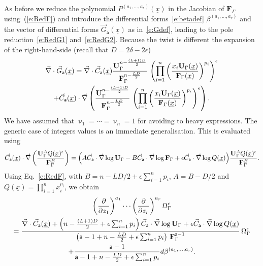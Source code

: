 \documentclass[a4paper,12pt]{article}
\numberwithin{equation}{section}
\numberwithin{figure}{section}
\begin{document}
As before we reduce the  polynomial
$P^{(a_1,\dots,a_r)}(\underline x)$ in the Jacobian of
$\textbf{F}_\Gamma$ using~(\ref{e:RedF}) and introduce the
differential forms~\eqref{e:betadef}
$\beta^{(a_1,\dots,a_r)}$  and the vector of differential forms $\vec
G_{\mathsf{a}}(\underline x)$ as in~\eqref{e:Gdef}, leading to the
pole reduction~\eqref{e:RedG1} and~\eqref{e:RedG2}.
Because the twist is different the expansion of the 
right-hand-side  (recall that $D=2\delta-2\epsilon$)
\begin{multline}
  \vec\nabla \cdot \vec G_{\mathsf{a}}(\underline x)=  \vec\nabla \cdot \vec C_{\mathsf{a}}(\underline x) { \textbf{U}_\Gamma ^{n-{(L+1)D\over2}}  \over \textbf{F}_\Gamma ^{n-{LD\over2}} }\,
  \left(\prod_{i=1}^n \left(x_i \textbf{U}_\Gamma(\underline x)\over
      \textbf{F}_\Gamma(\underline x)\right)^{p_i}\right)^{\epsilon} \cr
+
  \vec C_{\mathsf{a}}(\underline x) \cdot\vec\nabla  \left( { \textbf{U}_\Gamma ^{n-{(L+1)D\over2}}  \over \textbf{F}_\Gamma ^{n-{LD\over2}} }\,
  \left(\prod_{i=1}^n \left(x_i \textbf{U}_\Gamma(\underline x)\over
      \textbf{F}_\Gamma(\underline x)\right)^{p_i}\right)^{\epsilon} \right) .
\end{multline}
%
We have assumed that $\upnu_1=\cdots=\upnu_n=1$ for avoiding to heavy
expressions. The generic case of integers values is an immediate generalisation.
%
This is  evaluated using 
\begin{equation}
  \vec C_{\mathsf{a}}(\underline x)\cdot \vec\nabla
  \left(\mathbf{U}_\Gamma^{A}Q(\underline x)^\epsilon\over
\mathbf{F}_\Gamma^B\right)=\Big(A \vec
C_{\mathsf{a}}\cdot \vec\nabla \log\mathbf{U}_\Gamma -B \vec
C_{\mathsf{a}}\cdot \vec\nabla \log \mathbf{F}_\Gamma+\epsilon \vec
C_{\mathsf{a}}\cdot\vec\nabla \log Q(\underline                             x)\Big)
                            {\mathbf{U}_\Gamma^{A}Q(\underline x)^\epsilon\over
\mathbf{F}_\Gamma^B} .
\end{equation}
Using Eq.~\eqref{e:RedF}, with $B= n - LD/2+\epsilon \sum_{i=1}^n
p_i$,  $A=B-D/2$ and $Q(\underline x)=\prod_{i=1}^n x_i^{p_i}$,  we obtain
\begin{multline}
	\label{e:PredAnReg}
\left(\partial\over \partial z_1\right)^{a_1}\cdots\left(\partial
  \over\partial z_r\right)^{a_r} \Omega_\Gamma^\epsilon\cr={
\vec\nabla \cdot \vec C_{\mathsf{a}}
     (\underline x)
+   \left(n-{(L+1)D\over2}+\epsilon\sum_{i=1}^n p_i\right) \vec
    C_{\mathsf{a}}\cdot\vec\nabla\log\mathbf{U}_\Gamma+\epsilon \vec
    C_{\mathsf{a}}\cdot\vec\nabla\log Q(\underline x)\over
    \left(\mathsf{a}-1+n-{LD\over2}+\epsilon\sum_{i=1}^n p_i\right)\,\textbf{F}_\Gamma^{\mathsf{a}-1}}\,
  \Omega_\Gamma^\epsilon\cr
+{  \mathsf{a}-1 \over \mathsf{a}-1+n-{LD\over2}+\epsilon\sum_{i=1}^n p_i} d\beta^{(a_1,\dots,a_r)}.
\end{multline}
\end{document}

